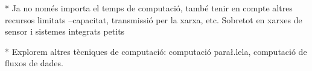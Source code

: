 





* Ja no només importa el temps de computació, també tenir en compte altres recursos limitats --capacitat, transmissió per la xarxa, etc. Sobretot en xarxes de sensor i sistemes integrats petits

* Explorem altres tècniques de computació: computació para\l.lela, computació de fluxos de dades.